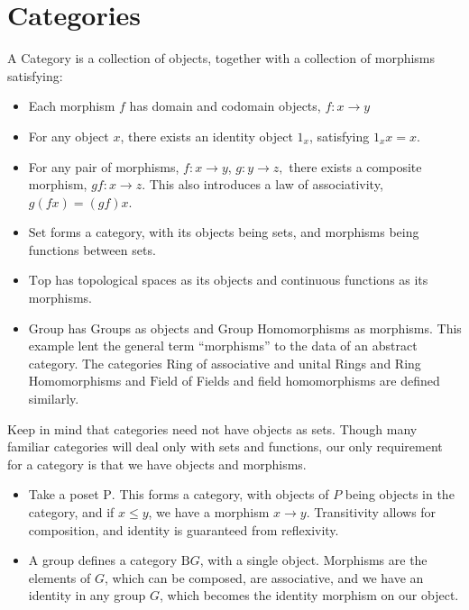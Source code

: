 \documentclass{article}
\begin{document}
\section{Categories}
\begin{defn}
    A Category is a collection of objects, together with a collection of morphisms satisfying:
    \begin{itemize}
        \item Each morphism $f$ has domain and codomain objects, $f:x\to y$
        \item For any object $x$, there exists an identity object $1_x$, satisfying $1_x x=x$.
        \item For any pair of morphisms, $f:x\to y$, $g:y\to z,$ there exists a composite morphism, $gf:x\to z$. This also introduces a law of associativity, $g(fx)=(gf)x$.    
    \end{itemize}
\end{defn}
\begin{exmp}
    \begin{itemize}
        \item $\mathrm{Set}$ forms a category, with its objects being sets, and morphisms being functions between sets.
        \item  $\mathrm{Top}$ has topological spaces as its objects and continuous functions as its morphisms.
        \item  $\mathrm{Group}$ has Groups as objects and Group Homomorphisms as morphisms. This example lent the general term “morphisms” to the data of an abstract category. The categories $\mathrm{Ring}$ of associative and unital Rings and Ring Homomorphisms and $\mathrm{Field}$ of Fields and field homomorphisms are defined similarly.
    \end{itemize}
\end{exmp}
\begin{exmp}
    Keep in mind that categories need not have objects as sets. Though many familiar categories will deal only with sets and functions, our only requirement for a category is that we have objects and morphisms.
    \begin{itemize}
        \item Take a poset $\mathrm{P}$. This forms a category, with objects of $P$ being objects in the category, and if $x\leq y$, we have a morphism $x\to y$. Transitivity allows for composition, and identity is guaranteed from reflexivity.
        \item A group defines a category $\mathrm{B}G$, with a single object. Morphisms are the elements of $G$, which can be composed, are associative, and we have an identity in any group $G$, which becomes the identity morphism on our object.
    \end{itemize}
    \iffalse
    \begin{rem}
        It may assist the reader to consider the single object in the category of a group as an object invariant under the action of the group. So consider a square, under the action of $D_4$. Every morphism of $\mathrm{B}D_4$ (element of $D_4$) leaves the square as it is, 
    \end{rem}
    \fi
\end{exmp}
\end{document}
